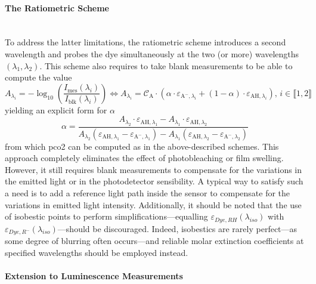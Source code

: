 \paragraph{The Ratiometric Scheme}\label{subsect:choos:dye_based:optical_schemes:ratiometric}\mbox{}\\

To address the latter limitations, the ratiometric scheme introduces a second wavelength and probes the dye simultaneously at the two (or more) wavelengths $(\lambda_1, \lambda_2)$. This scheme also requires to take blank measurements to be able to compute the value
\begin{equation}
	A_{\lambda_i} = - \log_{10}\left( \frac{I_\text{mes}(\lambda_i)}{I_\text{blk}(\lambda_i)}\right) \iff A_{\lambda_i} = \mathcal{C}_\text{A} \cdot \left( \alpha \cdot \varepsilon_{\text{A}^-,\lambda_i} + (1-\alpha) \cdot \varepsilon_{\text{AH},\lambda_i} \right) \text{, }i\in \llbracket 1, 2\rrbracket
\end{equation}
yielding an explicit form for $\alpha$
\begin{equation}
	\alpha = \frac{A_{\lambda_2} \cdot \varepsilon_{\text{AH},\lambda_1} - A_{\lambda_1} \cdot \varepsilon_{\text{AH},\lambda_2}}{A_{\lambda_2} (\varepsilon_{\text{AH},\lambda_1} - \varepsilon_{\text{A}^-,\lambda_1}) - A_{\lambda_1} (\varepsilon_{\text{AH},\lambda_2} - \varepsilon_{\text{A}^-,\lambda_2})}
\end{equation}
from which \gls{pco2} can be computed as in the above-described schemes. This approach completely eliminates the effect of photobleaching or film swelling. However, it still requires blank measurements to compensate for the variations in the emitted light or in the photodetector sensibility. A typical way to satisfy such a need is to add a reference light path inside the sensor to compensate for the variations in emitted light intensity\cite{ge2014}. Additionally, it should be noted that the use of isobestic points to perform simplifications---equalling $\varepsilon_{Dye, RH}(\lambda_{iso})$ with $\varepsilon_{Dye, R^-}(\lambda_{iso})$\cite{lakowicz1993}---should be discouraged. Indeed, isobestics are rarely perfect---as some degree of blurring often occurs\cite{mills2009, segawa2003}---and reliable molar extinction coefficients at specified wavelengths should be employed instead.

\paragraph{Extension to Luminescence Measurements}\mbox{}\\

